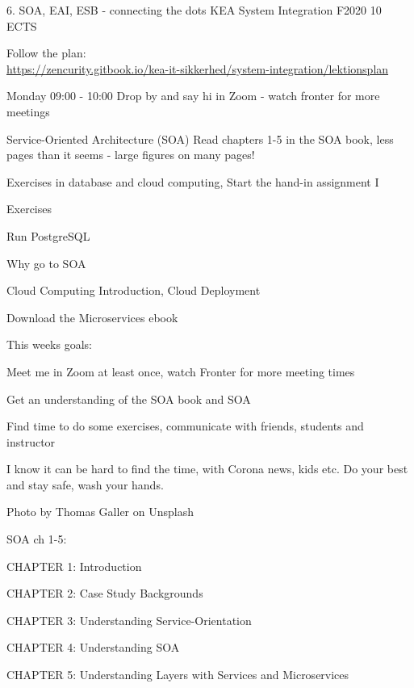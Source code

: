 \documentclass[Screen16to9,17pt]{foils}
\begin{document}
\mytitlepage
{6. SOA, EAI, ESB - connecting the dots}
{KEA System Integration F2020 10 ECTS}



\begin{list2}
\item Follow the plan:\\
\url{https://zencurity.gitbook.io/kea-it-sikkerhed/system-integration/lektionsplan}
\item Monday 09:00 - 10:00 Drop by and say hi in Zoom - watch fronter for more meetings
\item Service-Oriented Architecture (SOA) Read chapters 1-5 in the SOA book, less pages than it seems - large figures on many pages!
\item Exercises in database and cloud computing, Start the hand-in assignment I
\end{list2}

Exercises
\begin{list2}
\item Run PostgreSQL
\item Why go to SOA
\item Cloud Computing Introduction, Cloud Deployment
\item Download the Microservices ebook
\end{list2}




This weeks goals:
\begin{list2}
\item Meet me in Zoom at least once, watch Fronter for more meeting times
\item Get an understanding of the SOA book and SOA
\item Find time to do some exercises, communicate with friends, students and instructor
\end{list2}

I know it can be hard to find the time, with Corona news, kids etc. Do your best and stay safe, wash your hands.

Photo by Thomas Galler on Unsplash







SOA ch 1-5:
\begin{list2}
\item CHAPTER 1: Introduction
\item CHAPTER 2: Case Study Backgrounds
\item CHAPTER 3: Understanding Service-Orientation
\item CHAPTER 4: Understanding SOA
\item CHAPTER 5: Understanding Layers with Services and Microservices
\end{list2}










\slidenext
\end{document}
